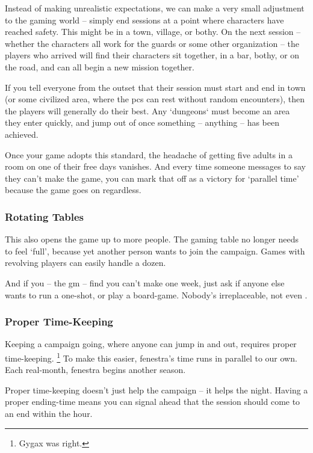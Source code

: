 \begin{multicols}{2}
Instead of making unrealistic expectations, we can make a very small adjustment to the gaming world -- simply end sessions at a point where characters have reached safety.
This might be in a town, village, or bothy.
On the next session -- whether the characters all work for the \glspl{guard} or some other organization -- the players who arrived will find their characters sit together, in a bar, bothy, or on the road, and can all begin a new mission together.

If you tell everyone from the outset that their session must start and end in town (or some civilized area, where the \glspl{pc} can rest without random encounters), then the players will generally do their best.
Any `dungeons` must become an area they enter quickly, and jump out of once something -- anything -- has been achieved.

Once your game adopts this standard, the headache of getting five adults in a room on one of their free days vanishes.
And every time someone messages to say they can't make the game, you can mark that off as a victory for `parallel time' because the game goes on regardless.

\subsubsection{Rotating Tables}

This also opens the game up to more people.
The gaming table no longer needs to feel `full', because yet another person wants to join the campaign.
Games with revolving players can easily handle a dozen.

And if you -- the \gls{gm} -- find you can't make one week, just ask if anyone else wants to run a one-shot, or play a board-game.
Nobody's irreplaceable, not even .

\subsubsection{Proper Time-Keeping}

Keeping a campaign going, where anyone can jump in and out, requires proper time-keeping.%
\footnote{Gygax was right.}
To make this easier, \gls{fenestra}'s time runs in parallel to our own.
Each real-month, \gls{fenestra} begins another season.

Proper time-keeping doesn't just help the campaign -- it helps the night.
Having a proper ending-time means you can signal ahead that the session should come to an end within the hour.


\end{multicols}
